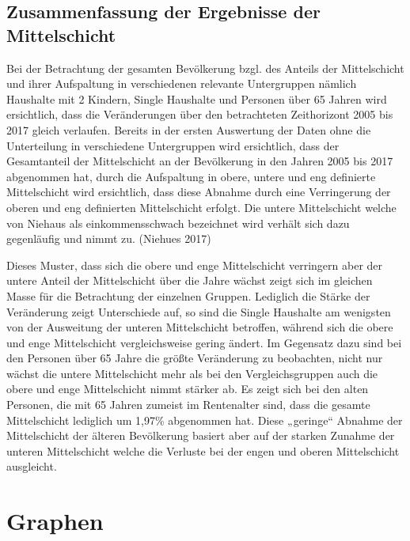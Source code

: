 \documentclass[12pt,]{article}
\begin{document}
\subsection{Zusammenfassung der Ergebnisse der
Mittelschicht}\label{zusammenfassung-der-ergebnisse-der-mittelschicht}

Bei der Betrachtung der gesamten Bevölkerung bzgl. des Anteils der
Mittelschicht und ihrer Aufspaltung in verschiedenen relevante
Untergruppen nämlich Haushalte mit 2 Kindern, Single Haushalte und
Personen über 65 Jahren wird ersichtlich, dass die Veränderungen über
den betrachteten Zeithorizont 2005 bis 2017 gleich verlaufen. Bereits in
der ersten Auswertung der Daten ohne die Unterteilung in verschiedene
Untergruppen wird ersichtlich, dass der Gesamtanteil der Mittelschicht
an der Bevölkerung in den Jahren 2005 bis 2017 abgenommen hat, durch die
Aufspaltung in obere, untere und eng definierte Mittelschicht wird
ersichtlich, dass diese Abnahme durch eine Verringerung der oberen und
eng definierten Mittelschicht erfolgt. Die untere Mittelschicht welche
von Niehaus als einkommensschwach bezeichnet wird verhält sich dazu
gegenläufig und nimmt zu. (Niehues 2017)

Dieses Muster, dass sich die obere und enge Mittelschicht verringern
aber der untere Anteil der Mittelschicht über die Jahre wächst zeigt
sich im gleichen Masse für die Betrachtung der einzelnen Gruppen.
Lediglich die Stärke der Veränderung zeigt Unterschiede auf, so sind die
Single Haushalte am wenigsten von der Ausweitung der unteren
Mittelschicht betroffen, während sich die obere und enge Mittelschicht
vergleichsweise gering ändert. Im Gegensatz dazu sind bei den Personen
über 65 Jahre die größte Veränderung zu beobachten, nicht nur wächst die
untere Mittelschicht mehr als bei den Vergleichsgruppen auch die obere
und enge Mittelschicht nimmt stärker ab. Es zeigt sich bei den alten
Personen, die mit 65 Jahren zumeist im Rentenalter sind, dass die
gesamte Mittelschicht lediglich um 1,97\% abgenommen hat. Diese
„geringe`` Abnahme der Mittelschicht der älteren Bevölkerung basiert
aber auf der starken Zunahme der unteren Mittelschicht welche die
Verluste bei der engen und oberen Mittelschicht ausgleicht.

\section{Graphen}\label{graphen}
\end{document}
